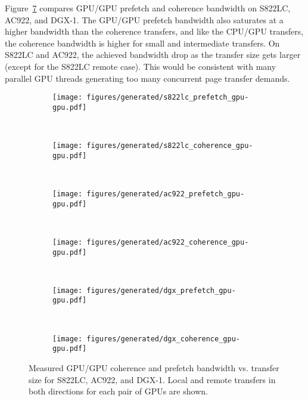 Figure~\ref{fig:um-gpu-gpu} compares GPU/GPU prefetch and coherence bandwidth on S822LC, AC922, and DGX-1.
The GPU/GPU prefetch bandwidth also saturates at a higher bandwidth than the coherence transfers, and like the CPU/GPU transfers, the coherence bandwidth is higher for small and intermediate transfers.
On S822LC and AC922, the achieved bandwidth drop as the transfer size gets larger (except for the S822LC remote case).
This would be consistent with many parallel GPU threads generating too many concurrent page transfer demands.


\begin{figure}[H]
	\centering
	\begin{subfigure}[b]{0.45\textwidth}
		\texttt{[image: figures/generated/s822lc\_prefetch\_gpu-gpu.pdf]}
		\caption{}
		\label{fig:um-prefetch-s822lc-gpu-gpu}
	\end{subfigure}
	~
	\begin{subfigure}[b]{0.45\textwidth}
		\texttt{[image: figures/generated/s822lc\_coherence\_gpu-gpu.pdf]}
		\caption{}
		\label{fig:um-coherence-s822lc-gpu-gpu}
	\end{subfigure}
	\\
	\begin{subfigure}[b]{0.45\textwidth}
		\texttt{[image: figures/generated/ac922\_prefetch\_gpu-gpu.pdf]}
		\caption{}
		\label{fig:um-prefetch-ac922-gpu-gpu}
	\end{subfigure}
	~
	\begin{subfigure}[b]{0.45\textwidth}
		\texttt{[image: figures/generated/ac922\_coherence\_gpu-gpu.pdf]}
		\caption{}
		\label{fig:um-coherence-ac922-gpu-gpu}
	\end{subfigure}
	\\
	\begin{subfigure}[b]{0.45\textwidth}
		\texttt{[image: figures/generated/dgx\_prefetch\_gpu-gpu.pdf]}
		\caption{}
		\label{fig:um-prefetch-dgx-gpu-gpu}
	\end{subfigure}
	~
	\begin{subfigure}[b]{0.45\textwidth}
		\texttt{[image: figures/generated/dgx\_coherence\_gpu-gpu.pdf]}
		\caption{}
		\label{fig:um-coherence-dgx-gpu-gpu}
	\end{subfigure}
	\caption[GPU/GPU Coherence and Prefetch Bandwidth]{
		Measured GPU/GPU coherence and prefetch bandwidth vs. transfer size for S822LC, AC922, and DGX-1.
		Local and remote transfers in both directions for each pair of GPUs are shown.
	}
	\label{fig:um-gpu-gpu}
\end{figure}



